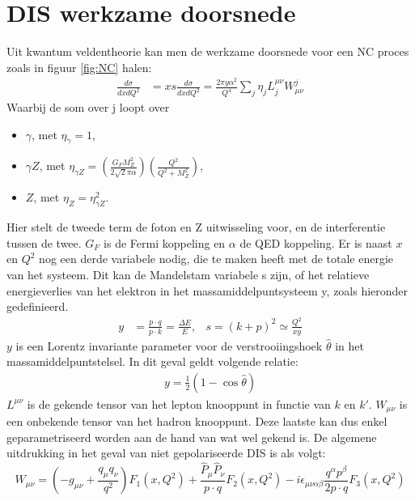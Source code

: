 \documentclass[a4paper,11pt]{article}
\numberwithin{equation}{section} %
\begin{document}
\section{DIS werkzame doorsnede} \label{app:SF}
Uit kwantum veldentheorie kan men de werkzame doorsnede voor een NC proces zoals in figuur \ref{fig:NC} halen:
\begin{align}
\frac{d\sigma}{dxdQ^2} &= xs \frac{d\sigma}{dxdQ^2} = \frac{2\pi y \alpha^2}{Q^4} \sum_j \eta_j L_j^{\mu \nu} W_{\mu \nu}^j
\end{align}
Waarbij de som over j loopt over
\begin{itemize}
  \item $\gamma$, met $\eta_\gamma=1$,
  \item $\gamma Z$, met $\eta_{\gamma Z} = \left( \frac{G_F M_Z^2}{2\sqrt{2}\pi \alpha} \right) \left(\frac{Q^2}{Q^2+M_Z^2} \right)$,
  \item $Z$, met $\eta_Z = \eta_{\gamma Z}^2$.
\end{itemize}
Hier stelt de tweede term de foton en Z uitwisseling voor, en de interferentie tussen de twee. $G_F$ is de Fermi koppeling en $\alpha$ de QED koppeling.
Er is naast $x$ en $Q^2$ nog een derde variabele nodig, die te maken heeft met de totale energie van het systeem.
Dit kan de Mandelstam variabele s zijn, of het relatieve energieverlies van het elektron in het massamiddelpuntsysteem y, zoals hieronder gedefinieerd.
\begin{align}
y &= \frac{p \cdot q}{p \cdot k} = \frac{\Delta E}{E} ,& s = (k+p)^2 \simeq \frac{Q^2}{xy}
\end{align}
$y$ is een Lorentz invariante parameter voor de verstrooiingshoek $\hat{\theta}$ in het massamiddelpuntstelsel.
In dit geval geldt volgende relatie:
\begin{align}
y = \frac{1}{2} \left( 1-\cos{\hat{\theta}} \right)
\end{align}
$L^{\mu \nu}$ is de gekende tensor van het lepton knooppunt in functie van $k$ en $k'$.
$W_{\mu \nu}$ is een onbekende tensor van het hadron knooppunt.
Deze laatste kan dus enkel geparametriseerd worden aan de hand van wat wel gekend is.
De algemene uitdrukking in het geval van niet gepolariseerde DIS is als volgt:
\begin{equation}
W_{\mu \nu} = \left( -g_{\mu \nu} + \frac{q_\mu q_\nu}{q^2} \right) F_1(x,Q^2) + \frac{\hat{P}_\mu \hat{P}_\nu}{p \cdot q} F_2(x,Q^2) -  i\epsilon_{\mu \nu \alpha \beta} \frac{q^\alpha p^\beta}{2p \cdot q} F_3(x,Q^2)
\end{equation}
\end{document}

